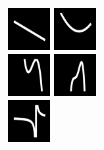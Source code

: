 \documentclass{article}
\begin{document}
\begin{figure}\vspace{-0.0cm} \newcommand{\functionSize}{1.1cm}\centering
  \begin{minipage}[c]{0.3\columnwidth}%
  \includegraphics[width = \functionSize]{figures/functions/6.png}
  \includegraphics[width = \functionSize]{figures/functions/48.png}\\
  \includegraphics[width = \functionSize]{figures/functions/102.png}
  \includegraphics[width = \functionSize]{figures/functions/116.png}\\
  \vspace{1pt}%
  \includegraphics[width = \functionSize]{figures/functions/160.png}

\end{minipage}
\end{figure}
\end{document}

